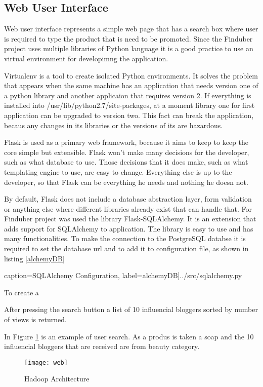 \subsection{Web User Interface}

Web user interface represents a simple web page that has a search box where user is required to type the product that is need to be promoted. Since the Finduber project uses multiple libraries of Python language it is a good practice to use an virtual environment for developimng the application.

Virtualenv is a tool to create isolated Python environments. It solves the problem that appears when the same machine has an application that needs version one of a python library and another applicaion that requires version 2. If everything is installed into 
/usr/lib/python2.7/site-packages, at a moment library one for first application can be upgraded to version two. This fact can break the application, becaus any changes in its libraries or the versions of its are hazardous. 

Flask is used as a primary web framework, because it aims to keep to keep the core simple but extensible. Flask won’t make many decisions for the developer, such as what database to use. Those decisions that it does make, such as what templating engine to use, are easy to change. Everything else is up to the developer, so that Flask can be everything he needs and nothing he doesn not.

By default, Flask does not include a database abstraction layer, form validation or anything else where different libraries already exist that can handle that. For Finduber project was used the library Flask-SQLAlchemy. It is an extension that adds support for SQLAlchemy to application. The library is easy to use and has many functionalities. To make the connection to the PostgreSQL databse it is required to set the database url and to add it to configuration file, as shown in listing \ref{alchemyDB}

 caption={SQLAlchemy Configuration}, label=alchemyDB]{../src/sqlalchemy.py}

To create a 


After pressing the search button a list of 10 influencial bloggers sorted by number of views is returned. 


In Figure \ref{web_app} is an example of user search. As a produs is taken a soap and the 10 influencial bloggers that are received are from beauty category.

\begin{figure}[!ht]
\centering
\texttt{[image: web]}
\caption{Hadoop Architecture}\label{web_app}
\end{figure}






